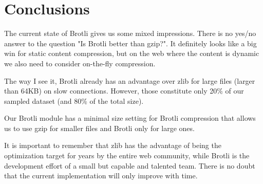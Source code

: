 \documentclass[12pt]{article}
\begin{document}
\section{Conclusions}

The current state of Brotli gives us some mixed impressions. There is no
yes/no answer to the question "Is Brotli better than gzip?". It
definitely looks like a big win for static content compression, but on
the web where the content is dynamic we also need to consider on-the-fly
compression.

The way I see it, Brotli already has an advantage over zlib for large
files (larger than 64KB) on slow connections. However, those constitute
only 20\% of our sampled dataset (and 80\% of the total size).

Our Brotli module has a minimal size setting for Brotli compression that
allows us to use gzip for smaller files and Brotli only for large ones.

It is important to remember that zlib has the advantage of being the
optimization target for years by the entire web community, while Brotli
is the development effort of a small but capable and talented team.
There is no doubt that the current implementation will only improve with
time.
\end{document}
